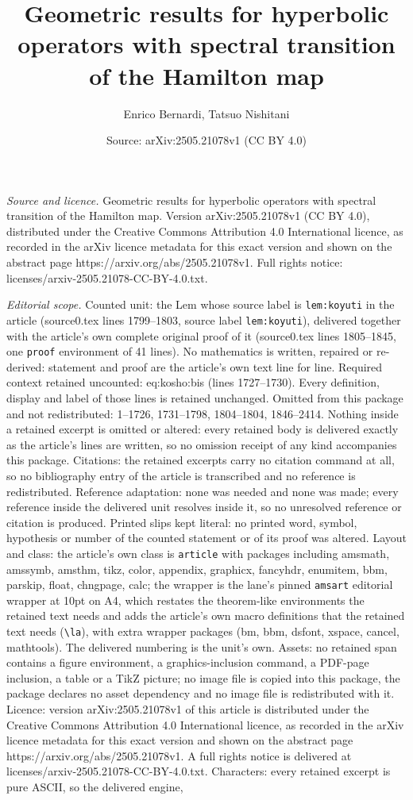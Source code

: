 \documentclass[10pt,a4paper]{amsart}
\title[Geometric results for hyperbolic operators with spectral tra]{Geometric results for hyperbolic operators with spectral transition of the Hamilton map}
\author{Enrico Bernardi, Tatsuo Nishitani}
\date{Source: arXiv:2505.21078v1 (CC BY 4.0)}
\begin{document}
\maketitle

\noindent\emph{Source and licence.} Geometric results for hyperbolic operators with spectral transition of the Hamilton map. Version arXiv:2505.21078v1 (CC BY 4.0), distributed under the Creative Commons Attribution 4.0 International licence, as recorded in the arXiv licence metadata for this exact version and shown on the abstract page https://arxiv.org/abs/2505.21078v1. Full rights notice: licenses/arxiv-2505.21078-CC-BY-4.0.txt.\par\smallskip

\noindent\textit{Editorial scope.} Counted unit: the Lem whose source label is \texttt{lem:koyuti} in the article (source0.tex lines 1799--1803, source label \texttt{lem:koyuti}), delivered together with the article's own complete original proof of it (source0.tex lines 1805--1845, one \texttt{proof} environment of 41 lines). No mathematics is written, repaired or re-derived: statement and proof are the article's own text line for line. Required context retained uncounted: eq:kosho:bis (lines 1727--1730). Every definition, display and label of those lines is retained unchanged. Omitted from this package and not redistributed: 1--1726, 1731--1798, 1804--1804, 1846--2414. Nothing inside a retained excerpt is omitted or altered: every retained body is delivered exactly as the article's lines are written, so no omission receipt of any kind accompanies this package. Citations: the retained excerpts carry no citation command at all, so no bibliography entry of the article is transcribed and no reference is redistributed. Reference adaptation: none was needed and none was made; every reference inside the delivered unit resolves inside it, so no unresolved reference or citation is produced. Printed slips kept literal: no printed word, symbol, hypothesis or number of the counted statement or of its proof was altered. Layout and class: the article's own class is \texttt{article} with packages including amsmath, amssymb, amsthm, tikz, color, appendix, graphicx, fancyhdr, enumitem, bbm, parskip, float, chngpage, calc; the wrapper is the lane's pinned \texttt{amsart} editorial wrapper at 10pt on A4, which restates the theorem-like environments the retained text needs and adds the article's own macro definitions that the retained text needs (\texttt{\textbackslash la}), with extra wrapper packages (bm, bbm, dsfont, xspace, cancel, mathtools). The delivered numbering is the unit's own. Assets: no retained span contains a figure environment, a graphics-inclusion command, a PDF-page inclusion, a table or a TikZ picture; no image file is copied into this package, the package declares no asset dependency and no image file is redistributed with it. Licence: version arXiv:2505.21078v1 of this article is distributed under the Creative Commons Attribution 4.0 International licence, as recorded in the arXiv licence metadata for this exact version and shown on the abstract page https://arxiv.org/abs/2505.21078v1. A full rights notice is delivered at licenses/arxiv-2505.21078-CC-BY-4.0.txt. Characters: every retained excerpt is pure ASCII, so the delivered engine, 
\end{document}
